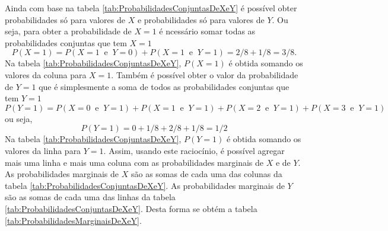\documentclass[
]{book}
\begin{document}
Ainda com base na tabela \ref{tab:ProbabilidadesConjuntasDeXeY} é possível obter probabilidades só para valores de \(X\) e probabilidades só para valores de \(Y\). Ou seja, para obter a probabilidade de \(X=1\) é ncessário somar todas as probabilidades conjuntas que tem \(X=1\)
\[
  P(X = 1) = P(X=1~\text{ e }~Y=0) + P(X=1~\text{ e }~Y=1) = 2/8 + 1/8 = 3/8.
\]
Na tabela \ref{tab:ProbabilidadesConjuntasDeXeY}, \(P(X = 1)\) é obtida somando os valores da coluna para \(X=1\).
Também é possível obter o valor da probabilidade de \(Y=1\) que é simplesmente a soma de todos as probabilidades conjuntas que tem \(Y=1\)
\[
  P(Y=1) = P(X=0~\text{ e }~Y=1) + P(X=1~\text{ e }~Y=1) +P(X=2~\text{ e }~Y=1) + P(X=3~\text{ e }~Y=1)
\]
ou seja,
\[
  P(Y=1) = 0 + 1/8 +2/8 + 1/8 = 1/2
\]
Na tabela \ref{tab:ProbabilidadesConjuntasDeXeY}, \(P(Y=1)\) é obtida somando os valores da linha para \(Y=1\).
Assim, usando este raciocínio, é possível agregar mais uma linha e mais uma coluna com as probabilidades marginais de \(X\) e de \(Y\). As probabilidades marginais de \(X\) são as somas de cada uma das colunas da tabela \ref{tab:ProbabilidadesConjuntasDeXeY}. As probabilidades marginais de \(Y\) são as somas de cada uma das linhas da tabela \ref{tab:ProbabilidadesConjuntasDeXeY}. Desta forma se obtém a tabela \ref{tab:ProbabilidadesMarginaisDeXeY}.
\end{document}
